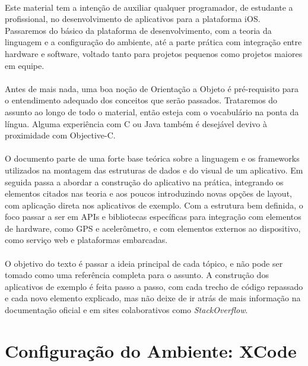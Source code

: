 \documentclass[a4paper,12pt,brazil,doubleside]{book}
\begin{document}
\begin{singlespace}
\paragraph{}Este material tem a intenção de auxiliar qualquer programador, de estudante a profissional, no desenvolvimento de aplicativos para a plataforma iOS. Passaremos do básico da plataforma de desenvolvimento, com a teoria da linguagem e a configuração do ambiente, até a parte prática com integração entre hardware e software, voltado tanto para projetos pequenos como projetos maiores em equipe.
\paragraph{}Antes de mais nada, uma boa noção de Orientação a Objeto é pré-requisito para o entendimento adequado dos conceitos que serão passados. Trataremos do assunto ao longo de todo o material, então esteja com o vocabulário na ponta da língua. Alguma experiência com C ou Java também é desejável devivo à proximidade com Objective-C.
\paragraph{}O documento parte de uma forte base teórica sobre a linguagem e os frameworks utilizados na montagem das estruturas de dados e do visual de um aplicativo. Em seguida passa a abordar a construção do aplicativo na prática, integrando os elementos citados nas teoria e aos poucos introduzindo novas opções de layout, com aplicação direta nos aplicativos de exemplo. Com a estrutura bem definida, o foco passar a ser em APIs e bibliotecas específicas para integração com elementos de hardware, como GPS e acelerômetro, e com elementos externos ao dispositivo, como serviço web e plataformas embarcadas.
\paragraph{}O objetivo do texto é passar a ideia principal de cada tópico, e não pode ser tomado como uma referência completa para o assunto. A construção dos aplicativos de exemplo é feita passo a passo, com cada trecho de código repassado e cada novo elemento explicado, mas não deixe de ir atrás de mais informação na documentação oficial e em sites colaborativos como \emph{StackOverflow}.

\bigskip
\bigskip

\section{Configuração do Ambiente: XCode}


\end{singlespace}
\end{document}
